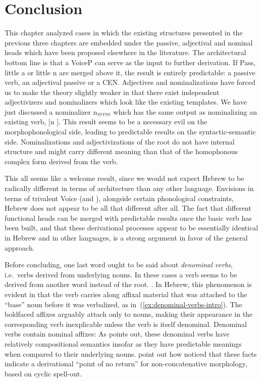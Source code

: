 \section{Conclusion}
This chapter analyzed cases in which the existing structures presented in the previous three chapters are embedded under the passive, adjectival and nominal heads which have been proposed elsewhere in the literature. The architectural bottom line is that a VoiceP can serve as the input to further derivation. If Pass, little a or little n are merged above it, the result is entirely predictable: a passive verb, an adjectival passive or a CEN. Adjectives and nominalizations have forced us to make the theory slightly weaker in that there exist independent adjectivizers and nominalizers which look like the existing templates. We have just discussed a nominalizer n$_{\gsc{INTNS}}$ which has the same output as nominalizing an existing verb, [n \tpie]. This result seems to be a necessary evil on the morphophonological side, leading to predictable results on the syntactic-semantic side. Nominalizations and adjectivizations of the root do not have internal structure and might carry different meaning than that of the homophonous complex form derived from the verb.

This all seems like a welcome result, since we would not expect Hebrew to be radically different in terms of architecture than any other language. Envisions in terms of trivalent Voice (and {\va}), alongside certain phonological constraints, Hebrew does not appear to be all that different after all. The fact that different functional heads can be merged with predictable results once the basic verb has been built, and that these derivational processes appear to be essentially identical in Hebrew and in other languages, is a strong argument in favor of the general approach.

Before concluding, one last word ought to be said about \emph{denominal verbs}, i.e.~verbs derived from underlying nouns. In these cases a verb seems to be derived from another word instead of the root. \cite{batel94,ussishkin99,ussishkin05,arad03}. In Hebrew, this phenomenon is evident in that the verb carries along affixal material that was attached to the ``base'' noun before it was verbalized, as in~(\ref{ex:denominal-verbs-intro}). The boldfaced affixes arguably attach only to nouns, making their appearance in the corresponding verb inexplicable unless the verb is itself denominal.
\pex \label{ex:denominal-verbs-intro}Denominal verbs contain nominal affixes:
\xe
As \cite{arad03} points out, these denominal verbs have relatively compositional semantics insofar as they have predictable meanings when compared to their underlying nouns. \cite{kastnertucker19cup} point out how \citeauthor{arad03} noticed that these facts indicate a derivational ``point of no return'' for non-concatenative morphology, based on cyclic spell-out.

